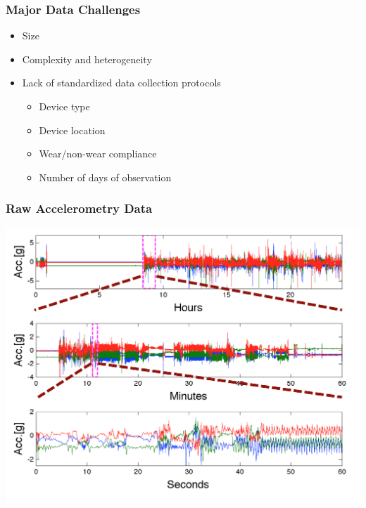 \documentclass[10pt]{beamer}\usepackage[]{graphicx}\usepackage[]{color}
\begin{document}
\begin{frame}
\frametitle{Major Data Challenges}
\begin{itemize}
\item Size
\item Complexity and heterogeneity
\item Lack of standardized data collection protocols
    \begin{itemize}
    \item Device type
    \item Device location 
    \item Wear/non-wear compliance
    \item Number of days of observation
    \end{itemize}
\end{itemize}
\end{frame}


\begin{frame}
\frametitle{Raw Accelerometry Data}
\includegraphics[width=\textwidth]{raw_accel_data_pt1}
\end{frame}
\end{document}

